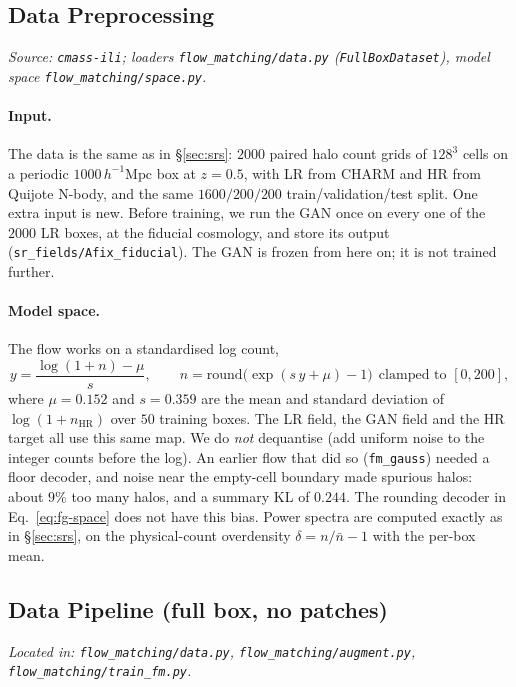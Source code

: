 \subsection{Data Preprocessing}
\textit{Source: \texttt{cmass-ili}; loaders \texttt{flow\_matching/data.py}
(\texttt{FullBoxDataset}), model space \texttt{flow\_matching/space.py}.}

\paragraph{Input.} The data is the same as in \S\ref{sec:srs}: $2000$ paired
halo count grids of $128^3$ cells on a periodic $1000\,h^{-1}\mathrm{Mpc}$ box at
$z=0.5$, with LR from CHARM and HR from Quijote N-body, and the same
$1600/200/200$ train/validation/test split. One extra input is new. Before
training, we run the GAN once on every one of the $2000$ LR boxes, at the
fiducial cosmology, and store its output (\texttt{sr\_fields/Afix\_fiducial}).
The GAN is frozen from here on; it is not trained further.

\paragraph{Model space.} The flow works on a standardised log count,
\begin{equation}
  y = \frac{\log(1+n) - \mu}{s}, \qquad
  n = \mathrm{round}\big(\exp(s\,y+\mu) - 1\big) \ \ \text{clamped to } [0, 200],
  \label{eq:fg-space}
\end{equation}
where $\mu=0.152$ and $s=0.359$ are the mean and standard deviation of
$\log(1+n_\text{HR})$ over $50$ training boxes. The LR field, the GAN field and
the HR target all use this same map. We do \emph{not} dequantise (add uniform
noise to the integer counts before the log). An earlier flow that did so
(\texttt{fm\_gauss}) needed a floor decoder, and noise near the empty-cell
boundary made spurious halos: about $9\%$ too many halos, and a summary KL of
$0.244$. The rounding decoder in Eq.~\ref{eq:fg-space} does not have this bias.
Power spectra are computed exactly as in \S\ref{sec:srs}, on the physical-count
overdensity $\delta = n/\bar n - 1$ with the per-box mean.

\subsection{Data Pipeline (full box, no patches)}
\textit{Located in: \texttt{flow\_matching/data.py},
\texttt{flow\_matching/augment.py}, \texttt{flow\_matching/train\_fm.py}.}


